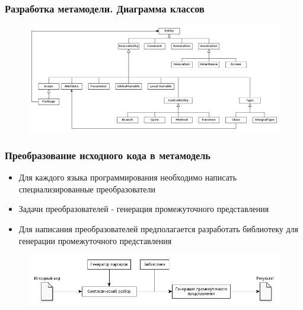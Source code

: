 \documentclass{beamer}
\begin{document}
\begin{frame}
\frametitle{Разработка метамодели. Диаграмма классов}

\begin{figure}[h!]
    \begin{center}
        \includegraphics[width=\textwidth]{img/metamodel.png}
    \end{center}
\end{figure}

\end{frame}
\begin{frame}
\frametitle{Преобразование исходного кода в метамодель}

\begin{itemize}
    \item Для каждого языка программирования необходимо написать специализированные
    преобразователи
    \item Задачи преобразователей - генерация промежуточного представления
    \item Для написания преобразователей предполагается разработать библиотеку для
    генерации промежуточного представления
\end{itemize}

\begin{figure}[h!]
    \begin{center}
        \includegraphics[width=\textwidth]{img/parser_architecture.png}
    \end{center}
\end{figure}

\end{frame}
\end{document}
